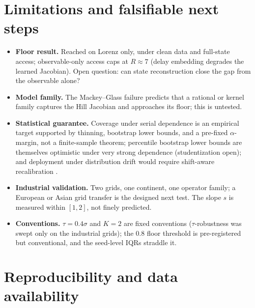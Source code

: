 \documentclass[aps,pre,twocolumn,superscriptaddress,nofootinbib,longbibliography]{revtex4-2}
\begin{document}
\section{Limitations and falsifiable next steps}
\label{sec:limitations}

\begin{itemize}
  \item \textbf{Floor result.} Reached on Lorenz only, under clean data
  and full-state access; observable-only access caps at $R \approx 7$
  (delay embedding degrades the learned Jacobian). Open question: can
  state reconstruction close the gap from the observable alone?
  \item \textbf{Model family.} The Mackey--Glass failure predicts that a
  rational or kernel family captures the Hill Jacobian and approaches its
  floor; this is untested.
  \item \textbf{Statistical guarantee.} Coverage under serial dependence
  is an empirical target supported by thinning, bootstrap lower bounds,
  and a pre-fixed $\alpha$-margin, not a finite-sample theorem;
  percentile bootstrap lower bounds are themselves optimistic under very
  strong dependence (studentization open); and deployment under
  distribution drift would require shift-aware recalibration
  \citep{tibshirani2019covariate,gibbs2021adaptive}.
  \item \textbf{Industrial validation.} Two grids, one continent, one
  operator family; a European or Asian grid transfer is the designed next
  test. The slope $s$ is measured within $[1,2]$, not finely predicted.
  \item \textbf{Conventions.} $\tau = 0.4\sigma$ and $K = 2$ are fixed
  conventions ($\tau$-robustness was swept only on the industrial grids);
  the $0.8$ floor threshold is pre-registered but conventional, and the
  seed-level IQRs straddle it.
\end{itemize}

\section{Reproducibility and data availability}
\label{sec:repro}
\end{document}
